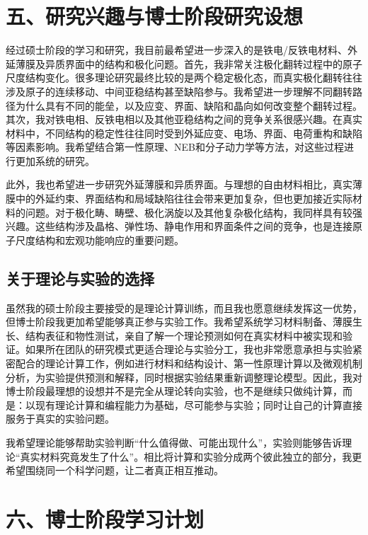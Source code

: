 \section{五、研究兴趣与博士阶段研究设想}

经过硕士阶段的学习和研究，我目前最希望进一步深入的是铁电/反铁电材料、外延薄膜及异质界面中的结构和极化问题。首先，我非常关注极化翻转过程中的原子尺度结构变化。很多理论研究最终比较的是两个稳定极化态，而真实极化翻转往往涉及原子的连续移动、中间亚稳结构甚至缺陷参与。我希望进一步理解不同翻转路径为什么具有不同的能垒，以及应变、界面、缺陷和晶向如何改变整个翻转过程。其次，我对铁电相、反铁电相以及其他亚稳结构之间的竞争关系很感兴趣。在真实材料中，不同结构的稳定性往往同时受到外延应变、电场、界面、电荷重构和缺陷等因素影响。我希望结合第一性原理、NEB和分子动力学等方法，对这些过程进行更加系统的研究。

此外，我也希望进一步研究外延薄膜和异质界面。与理想的自由材料相比，真实薄膜中的外延约束、界面结构和局域缺陷往往会带来更加复杂，但也更加接近实际材料的问题。对于极化畴、畴壁、极化涡旋以及其他复杂极化结构，我同样具有较强兴趣。这些结构涉及晶格、弹性场、静电作用和界面条件之间的竞争，也是连接原子尺度结构和宏观功能响应的重要问题。

\subsection*{关于理论与实验的选择}

虽然我的硕士阶段主要接受的是理论计算训练，而且我也愿意继续发挥这一优势，但博士阶段我更加希望能够真正参与实验工作。我希望系统学习材料制备、薄膜生长、结构表征和物性测试，亲自了解一个理论预测如何在真实材料中被实现和验证。如果所在团队的研究模式更适合理论与实验分工，我也非常愿意承担与实验紧密配合的理论计算工作，例如进行材料和结构设计、第一性原理计算以及微观机制分析，为实验提供预测和解释，同时根据实验结果重新调整理论模型。因此，我对博士阶段最理想的设想并不是完全从理论转向实验，也不是继续只做纯计算，而是：以现有理论计算和编程能力为基础，尽可能参与实验；同时让自己的计算直接服务于真实的实验问题。

我希望理论能够帮助实验判断“什么值得做、可能出现什么”，实验则能够告诉理论“真实材料究竟发生了什么”。相比将计算和实验分成两个彼此独立的部分，我更希望围绕同一个科学问题，让二者真正相互推动。

\section{六、博士阶段学习计划}

